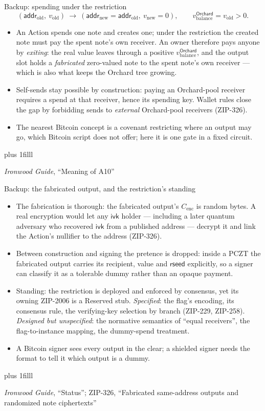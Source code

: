 \documentclass[aspectratio=169,11pt]{beamer}
\newcommand{\ivk}{\ensuremath{\mathsf{ivk}}}
\newcommand{\src}[1]{\par\vskip0pt plus 1filll
  {\fontsize{6}{7.2}\selectfont\color{arbdim}\raggedright #1\par}}
\begin{document}
\begin{frame}{Backup: spending under the restriction}
\vspace*{-4pt}
\setlength{\abovedisplayskip}{3pt}\setlength{\belowdisplayskip}{3pt}
\[
(\mathsf{addr}_{\mathrm{old}},\ v_{\mathrm{old}}) \ \longrightarrow\
(\mathsf{addr}_{\mathrm{new}} = \mathsf{addr}_{\mathrm{old}},\
 v_{\mathrm{new}} = 0), \qquad
v_{\mathrm{balance}}^{\mathsf{Orchard}} = v_{\mathrm{old}} > 0.
\]
\begin{itemize}
  \item An Action spends one note and creates one; under the restriction
    the created note must pay the spent note's own receiver. An owner
    therefore pays anyone by \emph{exiting}: the real value leaves through
    a positive $v_{\mathrm{balance}}^{\mathsf{Orchard}}$, and the output
    slot holds a \emph{fabricated} zero-valued note to the spent note's
    own receiver --- which is also what keeps the Orchard tree growing.
  \item Self-sends stay possible by construction: paying an Orchard-pool
    receiver requires a spend at that receiver, hence its spending key.
    Wallet rules close the gap by forbidding sends to \emph{external}
    Orchard-pool receivers (ZIP-326).
  \item The nearest Bitcoin concept is a covenant restricting where an
    output may go, which Bitcoin script does not offer; here it is one
    gate in a fixed circuit.
\end{itemize}
\src{\emph{Ironwood Guide}, ``Meaning of A10''}
\end{frame}

\begin{frame}{Backup: the fabricated output, and the restriction's standing}
\begin{itemize}
  \item The fabrication is thorough: the fabricated output's
    $C_{\mathrm{enc}}$ is random bytes. A real encryption would let any
    $\ivk$ holder --- including a later quantum adversary who recovered
    $\ivk$ from a published address --- decrypt it and link the Action's
    nullifier to the address (ZIP-326).
  \item Between construction and signing the pretence is dropped: inside a
    PCZT the fabricated output carries its recipient, value and
    $\mathsf{rseed}$ explicitly, so a signer can classify it as a
    tolerable dummy rather than an opaque payment.
  \item Standing: the restriction is deployed and enforced by consensus,
    yet its owning ZIP-2006 is a Reserved stub. \emph{Specified}: the
    flag's encoding, its consensus rule, the verifying-key selection by
    branch (ZIP-229, ZIP-258). \emph{Designed but unspecified}: the
    normative semantics of ``equal receivers'', the flag-to-instance
    mapping, the dummy-spend treatment.
  \item A Bitcoin signer sees every output in the clear; a shielded
    signer needs the format to tell it which output is a dummy.
\end{itemize}
\src{\emph{Ironwood Guide}, ``Status''; ZIP-326, ``Fabricated same-address
  outputs and randomized note ciphertexts''}
\end{frame}
\end{document}
